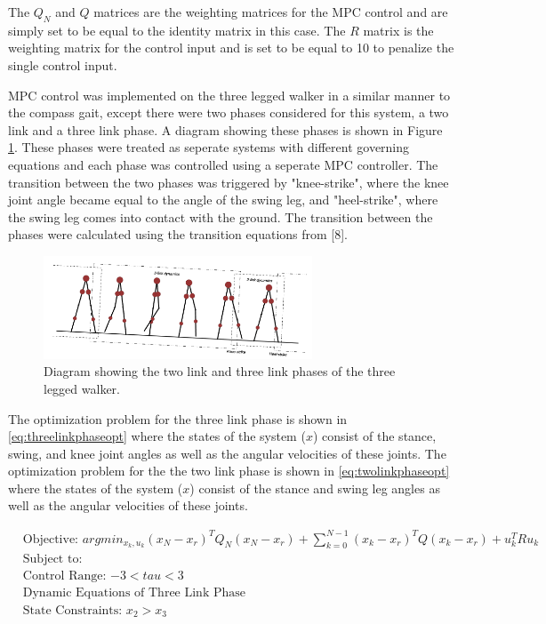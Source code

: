 \documentclass{./springer/svjour3}
\begin{document}
The $Q_N$ and $Q$ matrices are the weighting matrices for the MPC control and are simply set to be equal to the identity matrix in this case. 
The $R$ matrix is the weighting matrix for the control input and is set to be equal to 10 to penalize the single control input.

MPC control was implemented on the three legged walker in a similar manner to the compass gait, except there were two phases considered for this system, a two link and a 
three link phase. A diagram showing these phases is shown in Figure \ref{fig:threelegstates}. These phases were treated as seperate systems with different governing equations and 
each phase was controlled using a seperate MPC controller. The transition between the two phases was triggered by "knee-strike", where the 
knee joint angle became equal to the angle of the swing leg, and "heel-strike", where the swing leg comes into contact with the ground. The 
transition between the phases were calculated using the transition equations from [8].
\begin{figure}[!h]
  \centering
  \includegraphics[width=8cm]{./figures/threelegstates.png}
  \caption{Diagram showing the two link and three link phases of the three legged walker.}
  \label{fig:threelegstates}
\end{figure}

The optimization problem for the three link phase is shown in \ref{eq:threelinkphaseopt} where the states of the system ($x$) consist of 
the stance, swing, and knee joint angles as well as the angular velocities of these joints. The optimization problem for the the two link phase is 
shown in \ref{eq:twolinkphaseopt} where the states of the system ($x$) consist of the stance and swing leg angles as well as the angular velocities of these joints.

\begin{equation}
  \begin{aligned}
  &\text{Objective: $arg min_{x_k,u_k} (x_N - x_r)^TQ_N(x_N - x_r) + \sum_{k = 0}^{N-1} (x_k - x_r)^TQ(x_k - x_r) + u_k^TRu_k $}\\
  &\text{Subject to:}\\
  &\text{Control Range: $-3 < tau < 3$}\\
  &\text{Dynamic Equations of Three Link Phase}\\
  &\text{State Constraints: $x_2 > x_3 $}
  \end{aligned}
  \label{eq:threelinkphaseopt}
\end{equation}
\end{document}
